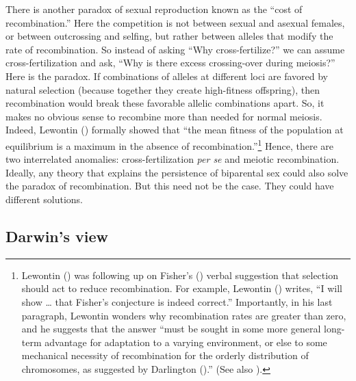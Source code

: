 \documentclass[
  american,
  letterpaper,
]{book}
\begin{document}
There is another paradox of sexual reproduction known as the ``cost of
recombination.'' Here the competition is not between sexual and asexual
females, or between outcrossing and selfing, but rather between alleles
that modify the rate of recombination. So instead of asking ``Why
cross-fertilize?'' we can assume cross-fertilization and ask, ``Why is
there excess crossing-over during meiosis?'' Here is the paradox. If
combinations of alleles at different loci are favored by natural
selection (because together they create high-fitness offspring), then
recombination would break these favorable allelic combinations apart.
So, it makes no obvious sense to recombine more than needed for normal
meiosis. Indeed, Lewontin () formally
showed that ``the mean fitness of the population at equilibrium is a
maximum in the absence of recombination.''\footnote{Lewontin
  () was following up on Fisher's
  () verbal suggestion that selection
  should act to reduce recombination. For example, Lewontin
  () writes, ``I will show \ldots{}
  that Fisher's conjecture is indeed correct.'' Importantly, in his last
  paragraph, Lewontin wonders why recombination rates are greater than
  zero, and he suggests that the answer ``must be sought in some more
  general long-term advantage for adaptation to a varying environment,
  or else to some mechanical necessity of recombination for the orderly
  distribution of chromosomes, as suggested by Darlington
  ().'' (See also
  ).} Hence, there are two
interrelated anomalies: cross-fertilization \emph{per se} and meiotic
recombination. Ideally, any theory that explains the persistence of
biparental sex could also solve the paradox of recombination. But this
need not be the case. They could have different solutions.

\subsection{Darwin's view}\label{darwins-view}
\end{document}
